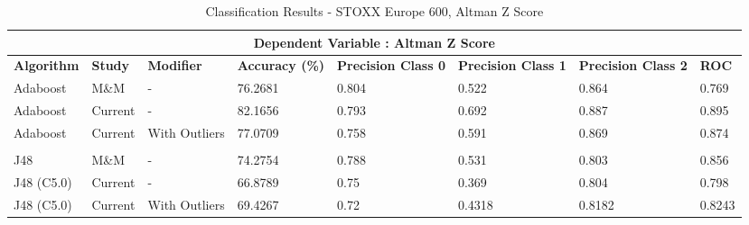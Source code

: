 \begin{table}[h]
\centering
\begin{sideways}%
\begin{tabular}{ |p{2.2cm}|p{1.55cm}|p{2.5cm}||p{2cm}|p{2cm}|p{2cm}|p{2cm}|p{1cm}|  }
 \hline
 \multicolumn{8}{|c|}{\bf Dependent Variable : Altman Z Score} \\
 \hline
 {\bf Algorithm} & {\bf Study} & {\bf Modifier} & {\bf Accuracy (\%)} & {\bf Precision Class 0} & {\bf Precision Class 1} &  {\bf Precision Class 2} & {\bf ROC} \\
 \hline
  Adaboost & M\&M & - & 76.2681  & 0.804 &  0.522 & 0.864 & 0.769  \\
  \rowcolor{gray}Adaboost & Current & - & 82.1656 & 0.793 & 0.692  & 0.887 & 0.895  \\
  Adaboost & Current & With Outliers & 77.0709 & 0.758 & 0.591 &  0.869 & 0.874  \\
  & & & & & & &\\
 \rowcolor{gray}J48  & M\&M & - & 74.2754  & 0.788 &  0.531 & 0.803 & 0.856  \\
  J48 (C5.0) & Current & - &  66.8789 & 0.75 & 0.369  & 0.804 & 0.798  \\
 \rowcolor{gray}J48  (C5.0) & Current & With Outliers & 69.4267 & 0.72 & 0.4318 & 0.8182  & 0.8243  \\

 \hline
\end{tabular}
\end{sideways}
\caption{Classification Results  - STOXX Europe 600, Altman Z Score}
\end{table}



\clearpage

